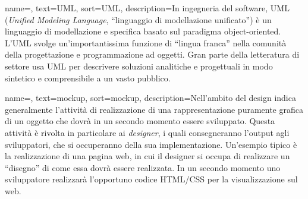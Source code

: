 
\renewcommand{\acronymname}{Acronimi e abbreviazioni}






   
\renewcommand{\glossaryname}{Glossario}

{
    name=,
    text=UML,
    sort=UML,
    description={In ingegneria del software, UML (\textit{Unified Modeling Language}, ``linguaggio di modellazione unificato'') è un linguaggio di modellazione e specifica basato sul paradigma object-oriented. L'UML svolge un'importantissima funzione di ``lingua franca'' nella comunità della progettazione e programmazione ad oggetti. Gran parte della letteratura di settore usa UML per descrivere soluzioni analitiche e progettuali in modo sintetico e comprensibile a un vasto pubblico.}
}

{
    name=,
    text=mockup,
    sort=mockup,
    description={Nell'ambito del design indica generalmente l'attività di realizzazione di una rappresentazione puramente grafica di un oggetto che dovrà in un secondo momento essere sviluppato. Questa attività è rivolta in particolare ai \textit{designer}, i quali consegneranno l'output agli sviluppatori, che si occuperanno della sua implementazione. Un'esempio tipico è la realizzazione di una pagina web, in cui il designer si occupa di realizzare un ``disegno'' di come essa dovrà essere realizzata. In un secondo momento uno sviluppatore realizzarà l'opportuno codice HTML/CSS per la visualizzazione sul web.}
}
    
